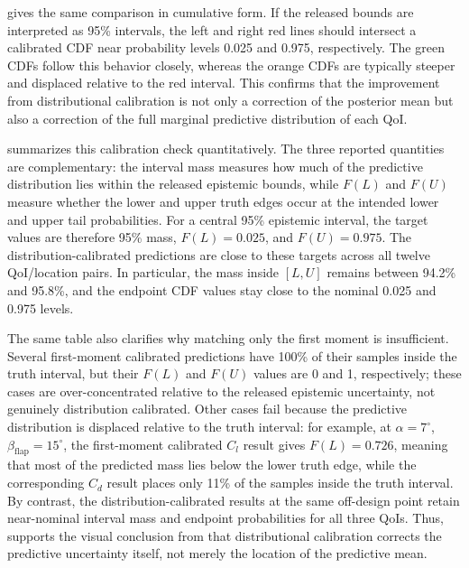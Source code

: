 \documentclass[journal]{new-aiaa}
\begin{document}
 gives the same comparison in cumulative form. If the released bounds are interpreted as 95\% intervals, the left and right red lines should intersect a calibrated CDF near probability levels 0.025 and 0.975, respectively. The green CDFs follow this behavior closely, whereas the orange CDFs are typically steeper and displaced relative to the red interval. This confirms that the improvement from distributional calibration is not only a correction of the posterior mean but also a correction of the full marginal predictive distribution of each QoI.

 summarizes this calibration check quantitatively. The three reported quantities are complementary: the interval mass measures how much of the predictive distribution lies within the released epistemic bounds, while $F(L)$ and $F(U)$ measure whether the lower and upper truth edges occur at the intended lower and upper tail probabilities. For a central 95\% epistemic interval, the target values are therefore 95\% mass, $F(L)=0.025$, and $F(U)=0.975$. The distribution-calibrated predictions are close to these targets across all twelve QoI/location pairs. In particular, the mass inside $[L,U]$ remains between 94.2\% and 95.8\%, and the endpoint CDF values stay close to the nominal 0.025 and 0.975 levels.

The same table also clarifies why matching only the first moment is insufficient. Several first-moment calibrated predictions have 100\% of their samples inside the truth interval, but their $F(L)$ and $F(U)$ values are 0 and 1, respectively; these cases are over-concentrated relative to the released epistemic uncertainty, not genuinely distribution calibrated. Other cases fail because the predictive distribution is displaced relative to the truth interval: for example, at $\alpha=7^\circ$, $\beta_{\mathrm{flap}}=15^\circ$, the first-moment calibrated $C_l$ result gives $F(L)=0.726$, meaning that most of the predicted mass lies below the lower truth edge, while the corresponding $C_d$ result places only 11\% of the samples inside the truth interval. By contrast, the distribution-calibrated results at the same off-design point retain near-nominal interval mass and endpoint probabilities for all three QoIs. Thus,  supports the visual conclusion from  that distributional calibration corrects the predictive uncertainty itself, not merely the location of the predictive mean.
\end{document}
